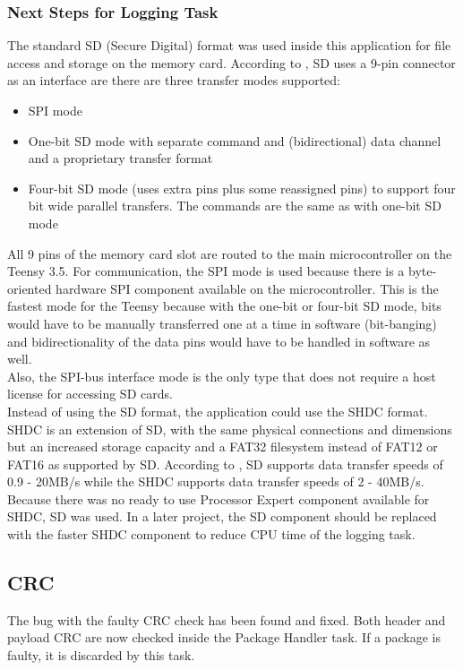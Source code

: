 \subsubsection{Next Steps for Logging Task}
The standard SD (Secure Digital) format was used inside this application for file access and storage on the memory card. According to \cite{SD_Wikipedia}, SD uses a 9-pin connector as an interface are there are three transfer modes supported:\begin{itemize}
    \item SPI mode 
    \item One-bit SD mode with separate command and (bidirectional) data channel and a proprietary transfer format
    \item Four-bit SD mode (uses extra pins plus some reassigned pins) to support four bit wide parallel transfers. The commands are the same as with one-bit SD mode
\end{itemize}
All 9 pins of the memory card slot are routed to the main microcontroller on the Teensy 3.5. For communication, the SPI mode is used because there is a byte-oriented hardware SPI component available on the microcontroller. This is the fastest mode for the Teensy because with the one-bit or four-bit SD mode, bits would have to be manually transferred one at a time in software (bit-banging) and bidirectionality of the data pins would have to be handled in software as well.\\
Also, the SPI-bus interface mode is the only type that does not require a host license for accessing SD cards.\\
Instead of using the SD format, the application could use the SHDC format. SHDC is an extension of SD, with the same physical connections and dimensions but an increased storage capacity and a FAT32 filesystem instead of FAT12 or FAT16 as supported by SD. According to \cite{SD_SiliconLabs}, SD supports data transfer speeds of 0.9 - 20MB/s while the SHDC supports data transfer speeds of 2 - 40MB/s.\\
Because there was no ready to use Processor Expert component available for SHDC, SD was used. In a later project, the SD component should be replaced with the faster SHDC component to reduce CPU time of the logging task.
%
\subsection{CRC}
The bug with the faulty CRC check has been found and fixed. Both header and payload CRC are now checked inside the Package Handler task. If a package is faulty, it is discarded by this task.
%
